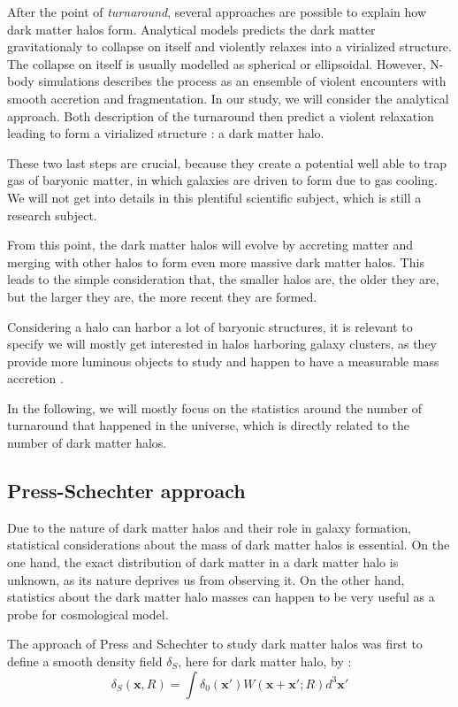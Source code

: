 After the point of \textit{turnaround}, several approaches are possible\cite{Maggiore} to explain how dark matter halos form.
Analytical models predicts the dark matter gravitationaly to collapse on itself and violently relaxes into a virialized structure. The collapse on itself is usually modelled as spherical or ellipsoidal.
However, N-body simulations describes the process as an ensemble of violent encounters with smooth accretion and fragmentation. In our study, we will consider the analytical approach. 
Both description of the turnaround then predict a violent relaxation leading to form a virialized structure : a dark matter halo.

These two last steps are crucial, because they create a potential well able to trap gas of baryonic matter, in which galaxies are driven to form due to gas cooling. We will not get into details in this plentiful scientific subject, which is still a research subject.

From this point, the dark matter halos will evolve by accreting matter and merging with other halos to form even more massive dark matter halos. This leads to the simple consideration that, the smaller halos are, the older they are, but the larger they are, the more recent they are formed.


Considering a halo can harbor a lot of baryonic structures, it is relevant to specify we will mostly get interested in halos harboring galaxy clusters, as they provide more luminous objects to study and happen to have a measurable mass accretion \cite{DeBoni}.

In the following, we will mostly focus on the statistics around the number of turnaround that happened in the universe, which is directly related to the number of dark matter halos.

\subsection{Press-Schechter approach}

Due to the nature of dark matter halos and their role in galaxy formation, statistical considerations about the mass of dark matter halos is essential. On the one hand, the exact distribution of dark matter in a dark matter halo is unknown, as its nature deprives us from observing it. On the other hand, statistics about the dark matter halo masses can happen to be very useful as a probe for cosmological model.

The approach of Press and Schechter \cite{PS} to study dark matter halos was first to define a smooth density field $\delta_S$, here for dark matter halo, by :
\begin{equation}
\label{Smooth Density Field}
\delta_S (\textbf{x}, R) =  \int \delta_0 (\textbf{x}') W(\textbf{x} + \textbf{x}' ; R) d^3 \textbf{x}'
\end{equation}

